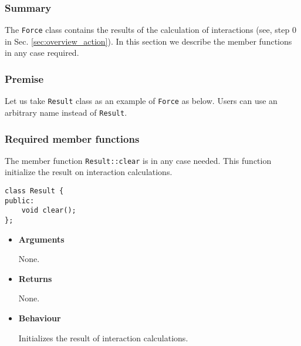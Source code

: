 \subsubsection{Summary}

The \texttt{Force} class contains the results of the calculation of interactions (see, step 0 in Sec. \ref{sec:overview_action}).
In this section we describe the member functions in any case required.

\subsubsection{Premise}

Let us take \texttt{Result} class as an example of \texttt{Force} as below.
Users can use an arbitrary name instead of \texttt{Result}.

\subsubsection{Required member functions}

The member function \texttt{Result::clear} is in any case needed.
This function initialize the result on interaction calculations.


\begin{screen}
\begin{verbatim}
class Result {
public:
    void clear();
};
\end{verbatim}
\end{screen}

\begin{itemize}

  
\item {\bf Arguments}

  None.
  
\item {\bf Returns}

  None.
  
\item {\bf Behaviour}

  Initializes the result of interaction calculations.
  
\end{itemize}

